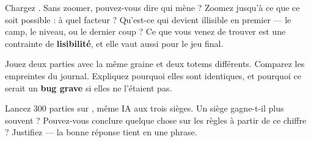 \begin{nkexo}
Chargez . Sans zoomer, pouvez-vous dire qui
mène ? Zoomez jusqu'à ce que ce soit possible : à quel facteur ? Qu'est-ce qui
devient illisible en premier — le camp, le niveau, ou le dernier coup ? Ce que
vous venez de trouver est une contrainte de \textbf{lisibilité}, et elle vaut
aussi pour le jeu final.
\end{nkexo}

\begin{nkexo}
Jouez deux parties avec la même graine et deux totems différents. Comparez les
empreintes du journal. Expliquez pourquoi elles sont identiques, et pourquoi ce
serait un \textbf{bug grave} si elles ne l'étaient pas.
\end{nkexo}

\begin{nkexo}
Lancez 300 parties sur , même IA aux trois sièges. Un
siège gagne-t-il plus souvent ? Pouvez-vous conclure quelque chose sur les règles
à partir de ce chiffre ? Justifiez — la bonne réponse tient en une phrase.
\end{nkexo}
